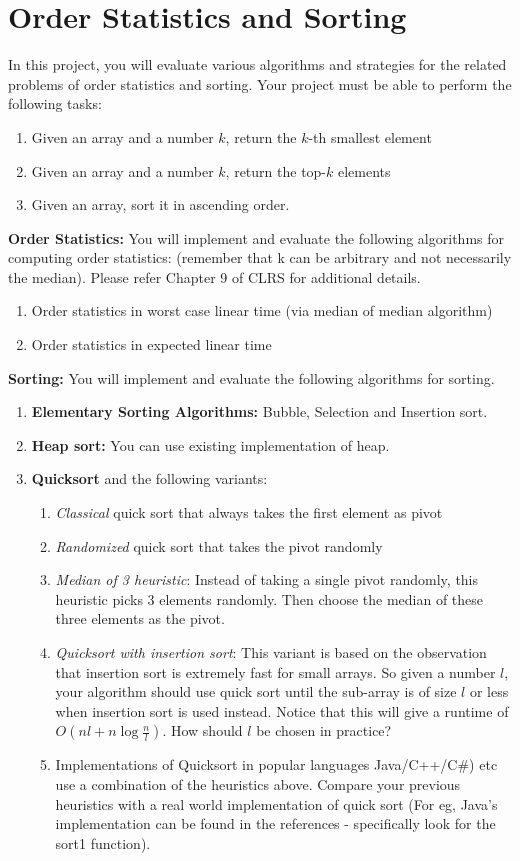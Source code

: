 \documentclass[12pt]{article}
\begin{document}
\section{Order Statistics and Sorting}
In this project, you will evaluate various algorithms and strategies for the related problems of order statistics and sorting. Your project must be able to perform the following tasks:
\begin{enumerate}
\item Given an array and a number $k$, return the $k$-th smallest element
\item Given an array and a number $k$, return the top-$k$ elements
\item Given an array, sort it in ascending order. 
\end{enumerate}

{\bf Order Statistics:} You will implement and evaluate the following algorithms for computing order statistics: (remember that k can be arbitrary and not necessarily the median). Please refer Chapter 9 of CLRS for additional details. 
\begin{enumerate}
\item Order statistics in worst case linear time (via median of median algorithm)
\item Order statistics in expected linear time 
\end{enumerate}

{\bf Sorting:} You will implement and evaluate the following algorithms for sorting. 
\begin{enumerate}
\item {\bf Elementary Sorting Algorithms:} Bubble, Selection and Insertion sort.
\item {\bf Heap sort:} You can use existing implementation of heap. 
\item {\bf Quicksort} and the following variants:
\begin{enumerate}
\item {\em Classical} quick sort that always takes the first element as pivot
\item {\em Randomized} quick sort that takes the pivot randomly
\item {\em Median of 3 heuristic}: Instead of taking a single pivot randomly, this heuristic picks 3 elements randomly. Then choose the median of these three elements as the pivot. 
\item {\em Quicksort with insertion sort}: This variant is based on the observation that insertion sort is extremely fast for small arrays. So given a number $l$, your algorithm should use quick sort until the sub-array is of size $l$ or less when insertion sort is used instead. Notice that this will give a runtime of $O(nl+n \log \frac{n}{l})$. How should $l$ be chosen in practice?
\item Implementations of Quicksort in popular languages Java/C++/C\#) etc use a combination of the heuristics above. Compare your previous heuristics with a real world implementation of quick sort (For eg, Java's implementation can be found in the references - specifically look for the sort1 function).
\end{enumerate}
\end{enumerate}
\end{document}
